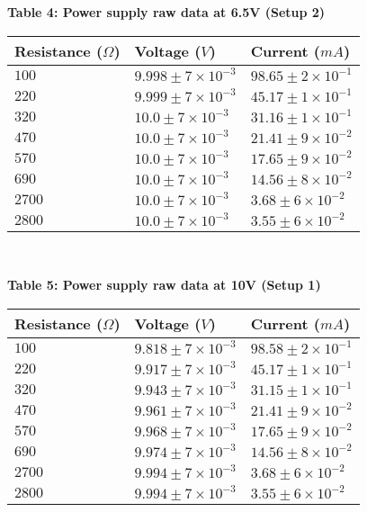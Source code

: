 \begin{center}
    {\textbf{Table 4: Power supply raw data at 6.5V (Setup 2)} }
\end{center}
\vspace{10pt}
\begin{tabular}{| p{} | p{} | p{} |}
    \hline
    Resistance ($\Omega$) & Voltage ($V$) & Current ($mA$)\\
    \hline 
    $100$ & $9.998 \pm 7\times10^{-3}$ & $98.65 \pm 2\times10^{-1}$\\
    $220$ & $9.999 \pm 7\times10^{-3}$ & $45.17 \pm 1\times10^{-1}$\\
    $320$ & $10.0 \pm 7\times10^{-3}$ & $31.16 \pm 1\times10^{-1}$\\
    $470$ & $10.0 \pm 7\times10^{-3}$ & $21.41 \pm 9\times10^{-2}$\\
    $570$ & $10.0 \pm 7\times10^{-3}$ & $17.65 \pm 9\times10^{-2}$\\
    $690$ & $10.0 \pm 7\times10^{-3}$ & $14.56 \pm 8\times10^{-2}$\\
    $2700$ & $10.0 \pm 7\times10^{-3}$ & $3.68 \pm 6\times10^{-2}$\\
    $2800$ & $10.0 \pm 7\times10^{-3}$ & $3.55 \pm 6\times10^{-2}$\\
    \hline 
 \end{tabular}\\

\begin{center}
    {\textbf{Table 5: Power supply raw data at 10V (Setup 1)} }
\end{center}
\vspace{10pt}
\begin{tabular}{| p{} | p{} | p{} |}
    \hline
    Resistance ($\Omega$) & Voltage ($V$) & Current ($mA$)\\
    \hline 
    $100$ & $9.818 \pm 7\times10^{-3}$ & $98.58 \pm 2\times10^{-1}$\\
    $220$ & $9.917 \pm 7\times10^{-3}$ & $45.17 \pm 1\times10^{-1}$\\
    $320$ & $9.943 \pm 7\times10^{-3}$ & $31.15 \pm 1\times10^{-1}$\\
    $470$ & $9.961 \pm 7\times10^{-3}$ & $21.41 \pm 9\times10^{-2}$\\
    $570$ & $9.968 \pm 7\times10^{-3}$ & $17.65 \pm 9\times10^{-2}$\\
    $690$ & $9.974 \pm 7\times10^{-3}$ & $14.56 \pm 8\times10^{-2}$\\
    $2700$ & $9.994 \pm 7\times10^{-3}$ & $3.68 \pm 6\times10^{-2}$\\
    $2800$ & $9.994 \pm 7\times10^{-3}$ & $3.55 \pm 6\times10^{-2}$\\
    \hline 
 \end{tabular}\\

